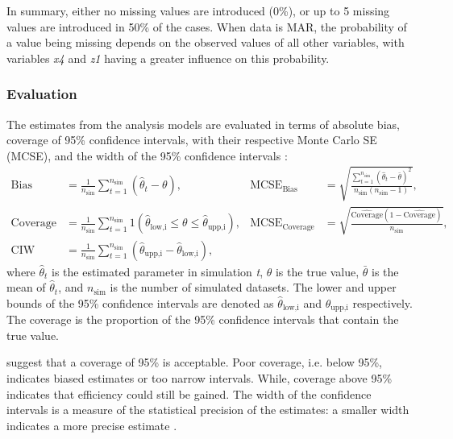 \documentclass[10pt, a4paper, titlepage]{article}
\begin{document}
In summary, either no missing values are introduced (0\%), or up to 5 missing values are introduced in 50\% of the cases. When data is MAR, the probability of a value being missing depends on the observed values of all other variables, with variables \textit{x4} and \textit{z1} having a greater influence on this probability.

\subsubsection{Evaluation}
The estimates from the analysis models are evaluated in terms of absolute bias, coverage of 95\% confidence intervals, with their respective Monte Carlo SE (MCSE), and the width of the 95\% confidence intervals \citep{morris2019,oberman2023}:
\begin{align}
    \text{Bias} &= \frac{1}{n_{\text{sim}}} \sum_{t=1}^{n_{\text{sim}}} (\hat{\theta}_t - \theta), &
    \text{MCSE}_{\text{Bias}} &= \sqrt{\frac{\sum_{t=1}^{n_{\text{sim}}} (\hat{\theta}_t - \bar{\theta})^2}{n_{\text{sim}}(n_{\text{sim}}-1)}}, \label{eq:bias} \\
    \text{Coverage} &= \frac{1}{n_{\text{sim}}} \sum_{t=1}^{n_{\text{sim}}} 1(\hat{\theta}_{\text{low,i}} \leq \theta \leq \hat{\theta}_{\text{upp,i}}), &
    \text{MCSE}_{\text{Coverage}} &= \sqrt{\frac{\hat{\text{Coverage}}(1-\hat{\text{Coverage}})}{n_{\text{sim}}}}, \label{eq:coverage} \\
    \text{CIW} &= \frac{1}{n_{\text{sim}}} \sum_{t=1}^{n_{\text{sim}}} (\hat{\theta}_{\text{upp,i}} - \hat{\theta}_{\text{low,i}}), \label{eq:width}
\end{align} where $\hat{\theta}_t$ is the estimated parameter in simulation \textit{t}, $\theta$ is the true value, $\bar{\theta}$ is the mean of $\hat{\theta}_t$, and $n_{\text{sim}}$ is the number of simulated datasets. The lower and upper bounds of the 95\% confidence intervals are denoted as $\hat{\theta}_{\text{low,i}}$ and $\hat{\theta}_{\text{upp,i}}$ respectively. The coverage is the proportion of the 95\% confidence intervals that contain the true value. 

\citet{morris2019,enders2018,oberman2023,buurenFlexibleImputationMissing2018} suggest that a coverage of 95\% is acceptable. Poor coverage, i.e. below 95\%, indicates biased estimates or too narrow intervals. While, coverage above 95\% indicates that efficiency could still be gained. The width of the confidence intervals is a measure of the statistical precision of the estimates: a smaller width indicates a more precise estimate \citep{oberman2023,buurenFlexibleImputationMissing2018}.
\end{document}
